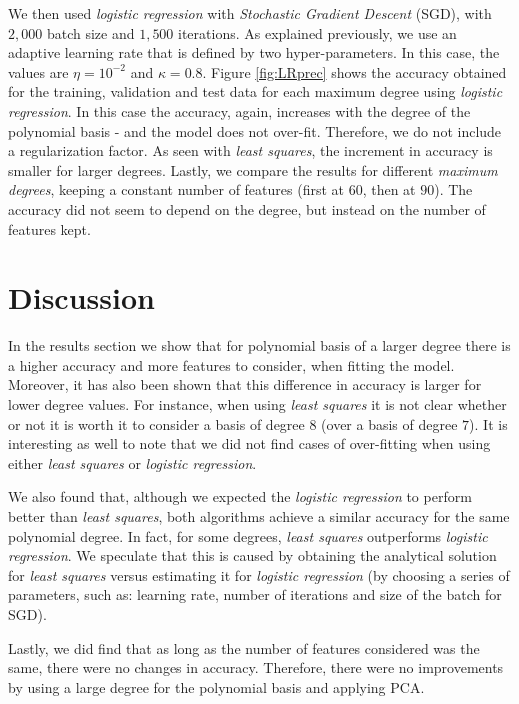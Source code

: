 \documentclass[10pt,conference,compsocconf]{IEEEtran}
\begin{document}
    We then used \textit{logistic regression} with \textit{Stochastic Gradient Descent} (SGD), with $2,000$ batch size and $1,500$ iterations. As explained previously, we use an adaptive learning rate that is defined by two hyper-parameters. In this case, the values are $\eta = 10^{-2}$ and $\kappa = 0.8$. Figure \ref{fig:LRprec} shows the accuracy obtained for the training, validation and test data for each maximum degree using \textit{logistic regression}.
    In this case the accuracy, again, increases with the degree of the polynomial basis - and the model does not over-fit. Therefore, we do not include a regularization factor. As seen with \textit{least squares}, the increment in accuracy is smaller for larger degrees. Lastly, we compare the results for different \emph{maximum degrees}, keeping a constant number of features (first at $60$, then at $90$). The accuracy did not seem to depend on the degree, but instead on the number of features kept.

\section{Discussion}
\label{sec:discussion}
  In the results section we show that for polynomial basis of a larger degree there is a higher accuracy and more features to consider, when fitting the model. Moreover, it has also been shown that this difference in accuracy is larger for lower degree values. For instance, when using \textit{least squares} it is not clear whether or not it is worth it to consider a basis of degree $8$ (over a basis of degree $7$). It is interesting as well to note that we did not find cases of over-fitting when using either \textit{least squares} or \textit{logistic regression}.

  We also found that, although we expected the \textit{logistic regression} to perform better than \textit{least squares}, both algorithms achieve a similar accuracy for the same polynomial degree. In fact, for some degrees, \textit{least squares} outperforms \textit{logistic regression}. We speculate that this is caused by obtaining the analytical solution for \textit{least squares} versus estimating it for \textit{logistic regression} (by choosing a series of parameters, such as: learning rate, number of iterations and size of the batch for SGD).

  Lastly, we did find that as long as the number of features considered was the same, there were no changes in accuracy. Therefore, there were no improvements by using a large degree for the polynomial basis and applying PCA.
\end{document}
